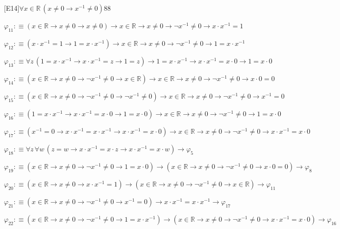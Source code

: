\begin{fullproof}{[E14]}{$\forall x \in \mathbb{R}\,(x \neq 0 \to x^{-1} \neq 0)$}{88}
\begin{abbrevlist}
\item $\varphi_{11} :\equiv (x \in \mathbb{R} \to x \neq 0 \to x \neq 0) \to x \in \mathbb{R} \to x \neq 0 \to \neg x^{-1} \neq 0 \to x \cdot x^{-1} = 1$
\item $\varphi_{12} :\equiv (x \cdot x^{-1} = 1 \to 1 = x \cdot x^{-1}) \to x \in \mathbb{R} \to x \neq 0 \to \neg x^{-1} \neq 0 \to 1 = x \cdot x^{-1}$
\item $\varphi_{13} :\equiv \forall z\,(1 = x \cdot x^{-1} \to x \cdot x^{-1} = z \to 1 = z) \to 1 = x \cdot x^{-1} \to x \cdot x^{-1} = x \cdot 0 \to 1 = x \cdot 0$
\item $\varphi_{14} :\equiv (x \in \mathbb{R} \to x \neq 0 \to \neg x^{-1} \neq 0 \to x \in \mathbb{R}) \to x \in \mathbb{R} \to x \neq 0 \to \neg x^{-1} \neq 0 \to x \cdot 0 = 0$
\item $\varphi_{15} :\equiv (x \in \mathbb{R} \to x \neq 0 \to \neg x^{-1} \neq 0 \to \neg x^{-1} \neq 0) \to x \in \mathbb{R} \to x \neq 0 \to \neg x^{-1} \neq 0 \to x^{-1} = 0$
\item $\varphi_{16} :\equiv (1 = x \cdot x^{-1} \to x \cdot x^{-1} = x \cdot 0 \to 1 = x \cdot 0) \to x \in \mathbb{R} \to x \neq 0 \to \neg x^{-1} \neq 0 \to 1 = x \cdot 0$
\item $\varphi_{17} :\equiv (x^{-1} = 0 \to x \cdot x^{-1} = x \cdot x^{-1} \to x \cdot x^{-1} = x \cdot 0) \to x \in \mathbb{R} \to x \neq 0 \to \neg x^{-1} \neq 0 \to x \cdot x^{-1} = x \cdot 0$
\item $\varphi_{18} :\equiv \forall z\,\forall w\,(z = w \to x \cdot x^{-1} = x \cdot z \to x \cdot x^{-1} = x \cdot w) \to \varphi_{5}$
\item $\varphi_{19} :\equiv (x \in \mathbb{R} \to x \neq 0 \to \neg x^{-1} \neq 0 \to 1 = x \cdot 0) \to (x \in \mathbb{R} \to x \neq 0 \to \neg x^{-1} \neq 0 \to x \cdot 0 = 0) \to \varphi_{8}$
\item $\varphi_{20} :\equiv (x \in \mathbb{R} \to x \neq 0 \to x \cdot x^{-1} = 1) \to (x \in \mathbb{R} \to x \neq 0 \to \neg x^{-1} \neq 0 \to x \in \mathbb{R}) \to \varphi_{11}$
\item $\varphi_{21} :\equiv (x \in \mathbb{R} \to x \neq 0 \to \neg x^{-1} \neq 0 \to x^{-1} = 0) \to x \cdot x^{-1} = x \cdot x^{-1} \to \varphi_{17}$
\item $\varphi_{22} :\equiv (x \in \mathbb{R} \to x \neq 0 \to \neg x^{-1} \neq 0 \to 1 = x \cdot x^{-1}) \to (x \in \mathbb{R} \to x \neq 0 \to \neg x^{-1} \neq 0 \to x \cdot x^{-1} = x \cdot 0) \to \varphi_{16}$
\end{abbrevlist}
\end{fullproof}
